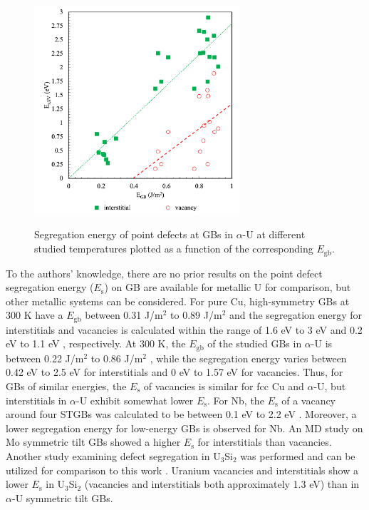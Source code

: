\documentclass[review]{elsarticle}
\begin{document}
\begin{figure}[h!]
\centering
\includegraphics[width = 3in]{13_SE_GB.png}\\
\caption{Segregation energy of point defects at GBs in $\alpha$-U at different studied temperatures plotted as a function of the corresponding $E_{\mathrm{gb}}$.}
\label{fig:SE_GB}
\end{figure}

To the authors' knowledge, there are no prior results on the point defect segregation energy ($E_{\mathrm{s}}$) on GB are available for metallic U for comparison, but other metallic systems can be considered. For pure Cu, high-symmetry GBs at 300 K \cite{bai_cu_inter, bai_cu_gb_with_interstitial_inter} have a  $E_{\mathrm{gb}}$  between 0.31 J/m${^2}$ to 0.89 J/m${^2}$ and the segregation energy for interstitials and vacancies is calculated within the range of 1.6 eV to 3 eV and 0.2 eV to 1.1 eV \cite{bai_cu_inter}, respectively. At 300 K, the  $E_{\mathrm{gb}}$  of the studied GBs in $\alpha$-U is between 0.22 J/m${^2}$ to 0.86 J/m${^2}$ \cite{MAHBUBA2021153072}, while the segregation energy varies between 0.42 eV to 2.5 eV for interstitials and 0 eV to 1.57 eV for vacancies. Thus, for GBs of similar energies, the $E_{\mathrm{s}}$ of vacancies is similar for fcc Cu and $\alpha$-U, but interstitials in $\alpha$-U exhibit somewhat lower $E_{\mathrm{s}}$. For Nb, the $E_{\mathrm{s}}$ of a vacancy around four STGBs was calculated to be between 0.1 eV to 2.2 eV \cite{Popov2022}. Moreover, a lower segregation energy for low-energy GBs is observed for Nb. An MD study on Mo symmetric tilt GBs showed a higher $E_{\mathrm{s}}$ for interstitials than vacancies\cite{Novoselov2014}. Another study examining defect segregation in U$_3$Si$_2$ was performed and can be utilized for comparison to this work \cite{beelerUSi}. Uranium vacancies and interstitials show a lower $E_{\mathrm{s}}$ in U$_\mathrm{3}$Si$_\mathrm{2}$ (vacancies and interstitials both approximately 1.3 eV) than in $\alpha$-U symmetric tilt GBs. 
\end{document}
